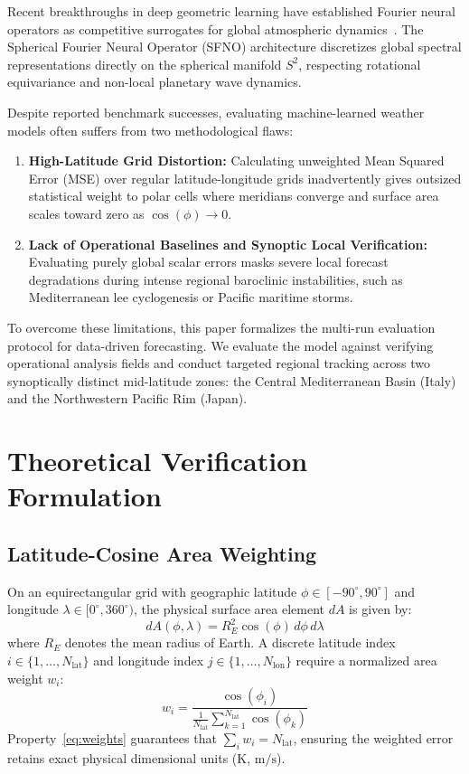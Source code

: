 \documentclass[10pt,twocolumn,letterpaper]{article}
\begin{document}
Recent breakthroughs in deep geometric learning have established Fourier neural operators as competitive surrogates for global atmospheric dynamics~\cite{pathak2022fourcastnet, bi2023accurate, lam2023learning}. The Spherical Fourier Neural Operator (SFNO) architecture discretizes global spectral representations directly on the spherical manifold $S^2$, respecting rotational equivariance and non-local planetary wave dynamics.

Despite reported benchmark successes, evaluating machine-learned weather models often suffers from two methodological flaws:
\begin{enumerate}
    \item \textbf{High-Latitude Grid Distortion:} Calculating unweighted Mean Squared Error (MSE) over regular latitude-longitude grids inadvertently gives outsized statistical weight to polar cells where meridians converge and surface area scales toward zero as $\cos(\phi) \to 0$.
    \item \textbf{Lack of Operational Baselines and Synoptic Local Verification:} Evaluating purely global scalar errors masks severe local forecast degradations during intense regional baroclinic instabilities, such as Mediterranean lee cyclogenesis or Pacific maritime storms.
\end{enumerate}

To overcome these limitations, this paper formalizes the multi-run evaluation protocol for data-driven forecasting. We evaluate the model against verifying operational analysis fields and conduct targeted regional tracking across two synoptically distinct mid-latitude zones: the Central Mediterranean Basin (Italy) and the Northwestern Pacific Rim (Japan).

\section{Theoretical Verification Formulation}

\subsection{Latitude-Cosine Area Weighting}
On an equirectangular grid with geographic latitude $\phi \in [-90^\circ, 90^\circ]$ and longitude $\lambda \in [0^\circ, 360^\circ)$, the physical surface area element $dA$ is given by:
\begin{equation}
dA(\phi, \lambda) = R_E^2 \cos(\phi) \, d\phi \, d\lambda
\end{equation}
where $R_E$ denotes the mean radius of Earth. A discrete latitude index $i \in \{1, \dots, N_\mathrm{lat}\}$ and longitude index $j \in \{1, \dots, N_\mathrm{lon}\}$ require a normalized area weight $w_i$:
\begin{equation}
w_i = \frac{\cos(\phi_i)}{\frac{1}{N_\mathrm{lat}} \sum_{k=1}^{N_\mathrm{lat}} \cos(\phi_k)}
\label{eq:weights}
\end{equation}
Property~\eqref{eq:weights} guarantees that $\sum_i w_i = N_\mathrm{lat}$, ensuring the weighted error retains exact physical dimensional units ($\si{\kelvin}$, $\si{\meter\per\second}$).
\end{document}
